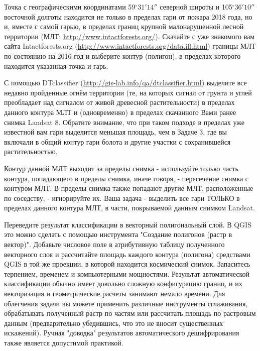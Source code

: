 
Точка с географическими координатами 59$^{\circ}31'14''$ северной широты и 105$^{\circ}36'10''$ восточной долготы 
находится не только в пределах гари от пожара 2018 года, но и, вместе с самой гарью, в пределах границ 
крупной малонарушенной лесной территории (МЛТ; \url{http://www.intactforests.org/}). Скачайте с уже знакомого 
вам сайта Intactforests.org (\url{http://www.intactforests.org/data.ifl.html}) границы МЛТ по состоянию на 2016 год и выберите контур (полигон), в пределах которого находится указанная точка и гарь.

С помощью DTclassifier (\url{http://gis-lab.info/qa/dtclassifier.html}) выделите все недавно пройденные огнём территории (те, на которых сигнал от грунта и углей преобладает над сигналом от живой древесной растительности) в пределах данного контура МЛТ и (одновременно) в пределах скачанного Вами ранее снимка Landsat 8. Обратите внимание, что при таком подходе в пределах уже известной вам гари выделится меньшая площадь, чем в Задаче 3, где вы включали в общий контур гари болота и другие участки с сохранившейся растительностью.

Контур данной МЛТ выходит за пределы снимка - используйте только часть контура, попадающего в пределы снимка, иначе говоря, - пересечение снимка с контуром МЛТ. В пределы снимка также попадают другие МЛТ, расположенные по соседству, - игнорируйте их. Ваша задача - выделить все гари ТОЛЬКО в пределах данного контура МЛТ, в части, покрываемой данным снимком Landsat.

Переведите результат классификации в векторный полигональный слой. В QGIS это можно сделать с помощью инструмента "Создание полигонов (растр в вектор)". Добавьте числовое поле в атрибутивную таблицу полученного векторного слоя и рассчитайте площадь каждого контура (полигона) средствами QGIS в той же проекции, в которой находится космический снимок. Запаситесь терпением, временем и компьютерными мощностями. Результат автоматической классификации обычно имеет довольно сложную конфигурацию границ, и их векторизация и геометрические расчеты занимают немало времени. Для облегчения задачи вы можете применить различные инструменты сглаживания, обрабатывать полученный растр по частям или рассчитать площадь по растровым данным (предварительно убедившись, что это не вносит существенных искажений). Ручная "доводка" результатов автоматического дешифрирования также является допустимой практикой.

